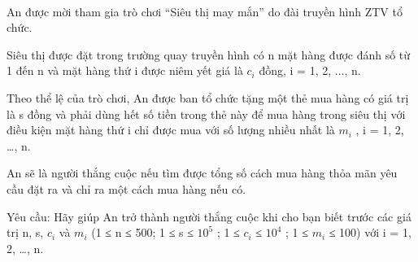  

An được mời tham gia trò chơi “Siêu thị may mắn” do đài truyền hình ZTV tổ chức.

Siêu thị được đặt trong trường quay truyền hình có n mặt hàng được đánh số từ 1 đến n và mặt hàng thứ i được niêm yết giá là $c_{i}$ đồng, i = 1, 2, ..., n.

Theo thể lệ của trò chơi, An được ban tổ chức tặng một thẻ mua hàng có giá trị là s đồng và phải dùng hết số tiền trong thẻ này để mua hàng trong siêu thị với điều kiện mặt hàng thứ i chỉ được mua với số lượng nhiều nhất là $m_{i}$ , i = 1, 2, …, n.

An sẽ là người thắng cuộc nếu tìm được tổng số cách mua hàng thỏa mãn yêu cầu đặt ra và chỉ ra một cách mua hàng nếu có.

Yêu cầu: Hãy giúp An trở thành người thắng cuộc khi cho bạn biết trước các giá trị n, s, $c_{i}$ và $m_{i}$ (1 ≤ n ≤ 500; 1 ≤ s ≤ $10^{5}$ ; 1 ≤ $c_{i}$ ≤ $10^{4}$ ; 1 ≤ $m_{i}$ ≤ 100) với i = 1, 2, …, n.